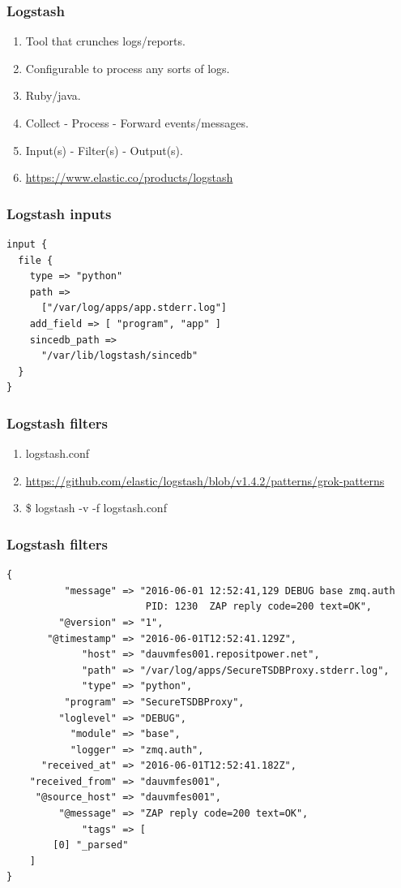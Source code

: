 \documentclass[13pt, ignorenonframetext]{beamer}
\begin{document}
\begin{frame}
\frametitle{Logstash}
\begin{enumerate}
    \item Tool that crunches logs/reports.
    \item Configurable to process any sorts of logs.
    \item Ruby/java.
    \item Collect - Process - Forward events/messages.
    \item Input(s) - Filter(s) - Output(s).
    \item \url{https://www.elastic.co/products/logstash}
\end{enumerate}
\end{frame}


\begin{frame}[fragile]
\frametitle{Logstash inputs}
\begin{lstlisting}[basicstyle=\footnotesize]
input {
  file {
    type => "python"
    path => 
      ["/var/log/apps/app.stderr.log"]
    add_field => [ "program", "app" ]
    sincedb_path => 
      "/var/lib/logstash/sincedb"
  }
}
\end{lstlisting}
\end{frame}


\begin{frame}
\frametitle{Logstash filters}
\begin{enumerate}
\item logstash.conf
\item \url{https://github.com/elastic/logstash/blob/v1.4.2/patterns/grok-patterns}
\item \$ logstash -v -f logstash.conf
\end{enumerate}
\end{frame}


\begin{frame}[fragile]
\frametitle{Logstash filters}
\begin{lstlisting}[basicstyle=\scriptsize]
{
          "message" => "2016-06-01 12:52:41,129 DEBUG base zmq.auth 
                        PID: 1230  ZAP reply code=200 text=OK",
         "@version" => "1",
       "@timestamp" => "2016-06-01T12:52:41.129Z",
             "host" => "dauvmfes001.repositpower.net",
             "path" => "/var/log/apps/SecureTSDBProxy.stderr.log",
             "type" => "python", 
          "program" => "SecureTSDBProxy",
         "loglevel" => "DEBUG",
           "module" => "base",
           "logger" => "zmq.auth",  
      "received_at" => "2016-06-01T12:52:41.182Z",
    "received_from" => "dauvmfes001",
     "@source_host" => "dauvmfes001",
         "@message" => "ZAP reply code=200 text=OK",
             "tags" => [
        [0] "_parsed"
    ]
}
\end{lstlisting}
\end{frame}
\end{document}
